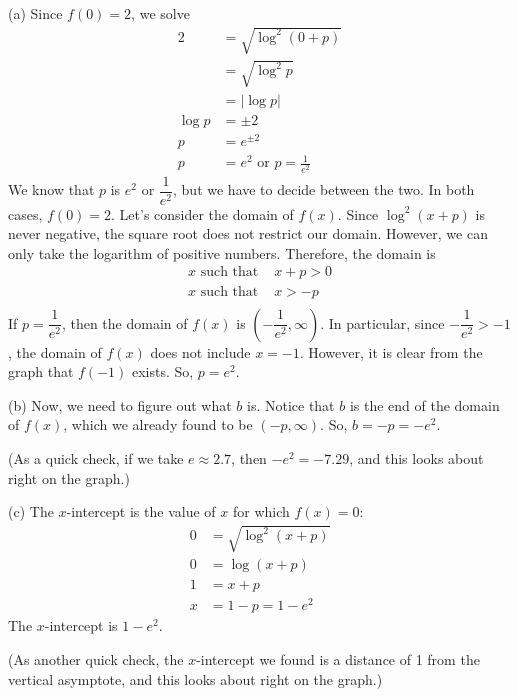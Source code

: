\begin{solution}
(a) Since $f(0)=2$, we solve
\begin{align*}
2&=\sqrt{\log^2(0+p)}\\
&=\sqrt{\log^2 p}\\
&=\left|\log p\right|\\
\log p &= \pm 2\\
p&=e^{\pm 2}\\
p&=e^2 \mbox{ or } p=\frac{1}{e^2}
\end{align*}
We know that $p$ is $e^2$ or $\dfrac{1}{e^2}$, but we have to decide between the two. In both cases, $f(0)=2$. Let's consider the domain of $f(x)$. Since $\log^2(x+p)$ is never negative, the square root does not restrict our domain. However, we can only take the logarithm of positive numbers. Therefore, the domain is
\begin{align*}
x \mbox{ such that } &x+p>0\\
x \mbox{ such that } &x>-p\\
\end{align*}
If $p=\dfrac{1}{e^2}$, then the domain of $f(x)$ is $\left(-\dfrac{1}{e^2},\infty\right)$. In particular, since $-\dfrac{1}{e^2}>-1$, the domain of $f(x)$ does not include $x=-1$. However, it is clear from the graph that $f(-1)$ exists. So, $p=e^2$.

(b) Now, we need to figure out what $b$ is.
Notice that $b$ is the end of the domain of $f(x)$, which we already found to be $(-p,\infty)$. So, $b=-p=-e^2$.

 (As a quick check, if we take $e\approx 2.7$, then $-e^2=-7.29$, and this looks about right on the graph.)

 (c) The $x$-intercept is the value of $x$ for which $f(x)=0$:
 \begin{align*}
 0&=\sqrt{\log^2(x+p)}\\
 0&=\log(x+p)\\
 1&=x+p\\
 x&=1-p=1-e^2
 \end{align*}
 The $x$-intercept is $1-e^2$.

 (As another quick check, the $x$-intercept we found is a distance of 1 from the vertical asymptote, and this looks about right on the graph.)
\end{solution}



